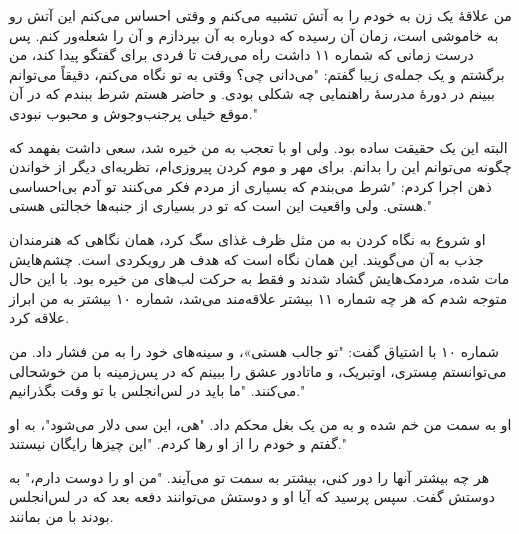 \setRTL
من علاقهٔ یک زن به خودم را به آتش تشبیه می‌کنم و وقتی احساس می‌کنم این آتش رو به خاموشی است، زمان آن رسیده که دوباره به آن بپردازم و آن را شعله‌ور کنم. پس درست زمانی که شماره ۱۱ داشت راه می‌رفت تا فردی برای گفتگو پیدا کند، من برگشتم و یک جمله‌ی زیبا گفتم: "می‌دانی چی؟ وقتی به تو نگاه می‌کنم، دقیقاً می‌توانم ببینم در دورهٔ مدرسهٔ راهنمایی چه شکلی بودی. و حاضر هستم شرط ببندم که در آن موقع خیلی پرجنب‌وجوش و محبوب نبودی."

البته این یک حقیقت ساده بود. ولی او با تعجب به من خیره شد، سعی داشت بفهمد که چگونه می‌توانم این را بدانم. برای مهر و موم کردن پیروزی‌ام، تظریه‌ای دیگر از خواندن ذهن اجرا کردم: "شرط می‌بندم که بسیاری از مردم فکر می‌کنند تو آدم بی‌احساسی هستی. ولی واقعیت این است که تو در بسیاری از جنبه‌ها خجالتی هستی."

او شروع به نگاه کردن به من مثل ظرف غذای سگ کرد، همان نگاهی که هنرمندان جذب به آن می‌گویند. این همان نگاه است که هدف هر رویکردی است. چشم‌هایش مات شده، مردمک‌هایش گشاد شدند و فقط به حرکت لب‌های من خیره بود. با این حال متوجه شدم که هر چه شماره ۱۱ بیشتر علاقه‌مند می‌شد، شماره ۱۰ بیشتر به من ابراز علاقه کرد.

شماره ۱۰ با اشتیاق گفت: "تو جالب هستی»، و سینه‌های خود را به من فشار داد. من می‌توانستم مِستری، اوتبریک، و ماتادور عشق را ببینم که در پس‌زمینه با من خوشحالی می‌کنند. "ما باید در لس‌انجلس با تو وقت بگذرانیم."

او به سمت من خم شده و به من یک بغل محکم داد. "هی، این سی دلار می‌شود"، به او گفتم و خودم را از او رها کردم. "این چیزها رایگان نیستند."

هر چه بیشتر آنها را دور کنی، بیشتر به سمت تو می‌آیند. "من او را دوست دارم،" به دوستش گفت. سپس پرسید که آیا او و دوستش می‌توانند دفعه بعد که در لس‌انجلس بودند با من بمانند.